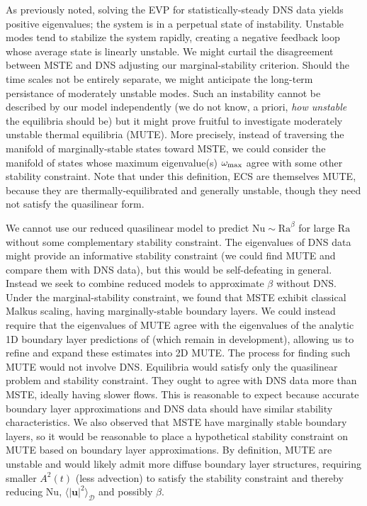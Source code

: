 \documentclass[reprint,amsmath,amssymb,aps]{revtex4-1}
\newcommand\Ra{\mathrm{Ra}}
\newcommand\Nu{\mathrm{Nu}}
\begin{document}
As previously noted, solving the EVP for statistically-steady DNS data yields positive eigenvalues; the system is in a perpetual state of instability. 
Unstable modes tend to stabilize the system rapidly, creating a negative feedback loop whose average state is linearly unstable. 
We might curtail the disagreement between MSTE and DNS adjusting our marginal-stability criterion. 
Should the time scales not be entirely separate, we might anticipate the long-term persistance of moderately unstable modes. 
Such an instability cannot be described by our model independently (we do not know, a priori, \textit{how unstable} the equilibria should be) but it might prove fruitful to investigate moderately unstable thermal equilibria (MUTE). 
More precisely, instead of traversing the manifold of marginally-stable states toward MSTE, we could consider the manifold of states whose maximum eigenvalue(s) $\omega_{\rm{max}}$ agree with some other stability constraint. 
Note that under this definition, ECS are themselves MUTE, because they are thermally-equilibrated and generally unstable, though they need not satisfy the quasilinear form.

We cannot use our reduced quasilinear model to predict $\Nu \sim\Ra^{\beta}$ for large $\Ra$ without some complementary stability constraint. 
The eigenvalues of DNS data might provide an informative stability constraint (we could find MUTE and compare them with DNS data), but this would be self-defeating in general. 
Instead we seek to combine reduced models to approximate $\beta$ without DNS. Under the marginal-stability constraint, we found that MSTE exhibit classical Malkus scaling, having marginally-stable boundary layers. 
We could instead require that the eigenvalues of MUTE agree with the eigenvalues of the analytic 1D boundary layer predictions of \cite{Shishkina, Zhang_20} (which remain in development), allowing us to refine and expand these estimates into 2D MUTE. 
The process for finding such MUTE would not involve DNS. Equilibria would satisfy only the quasilinear problem and stability constraint. 
They ought to agree with DNS data more than MSTE, ideally having slower flows. 
This is reasonable to expect because accurate boundary layer approximations and DNS data should have similar stability characteristics. 
We also observed that MSTE have marginally stable boundary layers, so it would be reasonable to place a hypothetical stability constraint on MUTE based on boundary layer approximations.
By definition, MUTE are unstable and would likely admit more diffuse boundary layer structures, requiring smaller $A^2(t)$ (less advection) to satisfy the stability constraint and thereby reducing $\Nu$, $\langle |\mathbf{u}|^2 \rangle_{\mathcal{D}}$ and possibly $\beta$.
\end{document}
